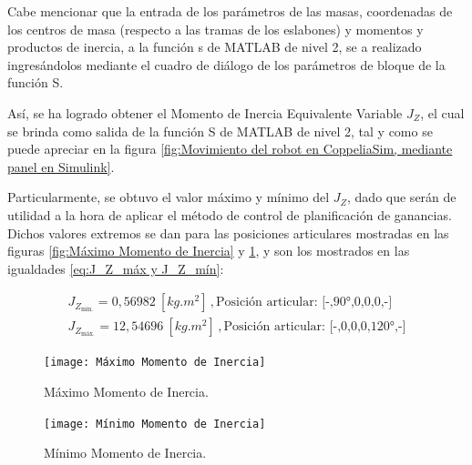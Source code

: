 \documentclass{article}
\begin{document}
\begin{sloppypar}
Cabe mencionar que la entrada de los parámetros de las masas, coordenadas de los centros de masa (respecto a las tramas de los eslabones) y momentos y productos de inercia, a la función s de MATLAB de nivel 2, se a realizado ingresándolos mediante el cuadro de diálogo de los parámetros de bloque \cite{Pass_Dialog_Parameters} de la función S.

Así, se ha logrado obtener el Momento de Inercia Equivalente Variable $J_Z$, el cual se brinda como salida de la función S de MATLAB de nivel 2, tal y como se puede apreciar en la figura \ref{fig:Movimiento del robot en CoppeliaSim, mediante panel en Simulink}.

Particularmente, se obtuvo el valor máximo y mínimo del $J_Z$, dado que serán de utilidad a la hora de aplicar el método de control de planificación de ganancias. Dichos valores extremos se dan para las posiciones articulares mostradas en las figuras \ref{fig:Máximo Momento de Inercia} y \ref{fig:Mínimo Momento de Inercia}, y son los mostrados en las igualdades \ref{eq:J_Z_máx y J_Z_mín}:

\begin{subequations} \label{eq:J_Z_máx y J_Z_mín}
	\begin{align}
        J_{Z_{\text{mín.}}} =  0,56982 ~[kg.m^2] \,, \text{Posición articular: [-,90°,0,0,0,-]}
        \\
        J_{Z_{\text{máx.}}} = 12,54696 ~[kg.m^2] \,, \text{Posición articular: [-,0,0,0,120°,-]}
    \end{align}
\end{subequations}

\begin{figure}[H]
    \centering
    \begin{minipage}{.5\textwidth}
        \centering
        \texttt{[image: Máximo Momento de Inercia]}
        \caption{Máximo Momento de Inercia.}
        \label{fig:Máximo Momento de Inercia}
    \end{minipage}%
    \begin{minipage}{.5\textwidth}
        \centering
        \texttt{[image: Mínimo Momento de Inercia]}
        \caption{Mínimo Momento de Inercia.}
        \label{fig:Mínimo Momento de Inercia}
    \end{minipage}
\end{figure}




\end{sloppypar}
\end{document}
